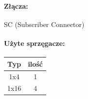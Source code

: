 	\paragraph{Złącza:}
		SC (Subscriber Connector)
	\paragraph{Użyte sprzęgacze:}
		\begin{center}
			\begin{table}[htbp]
				\centering
				\begin{tabular}{|c|c|}
					\hline
					\textbf{Typ} & \textbf{ilość} \\ \hline
					1x4          & 1              \\ \hline
					1x16         & 4              \\ \hline
				\end{tabular}
			\end{table}
		\end{center}
